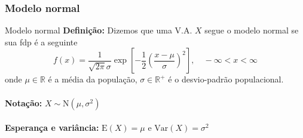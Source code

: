 \documentclass[10pt]{beamer}\usepackage[]{graphicx}\usepackage[]{color}
\providecommand{\E}{\text{E}}
\providecommand{\Var}{\text{Var}}
\providecommand{\N}{\text{N}}
\theoremstyle{definition}
\begin{document}

\subsubsection{Modelo normal}

\begin{frame}[fragile]{Modelo normal}
  \textbf{Definição:} Dizemos que uma V.A. $X$ segue o modelo
  normal se sua fdp é a seguinte
  \begin{equation*}
    f(x) = \frac{1}{\sqrt{2\pi}\sigma} \exp\left[-\frac{1}{2} \left( \frac{x -
          \mu}{\sigma}\right)^2\right], \quad -\infty < x < \infty
  \end{equation*}
  onde $\mu \in \mathbb{R}$ é a média da população, $\sigma \in
  \mathbb{R}^+$ é o desvio-padrão populacional. \\~\\
  \textbf{Notação:} $X \sim \N(\mu, \sigma^2)$ \\~\\
  \textbf{Esperança e variância:} $\E(X) = \mu$ e $\Var(X) = \sigma^2$
\end{frame}
\end{document}
